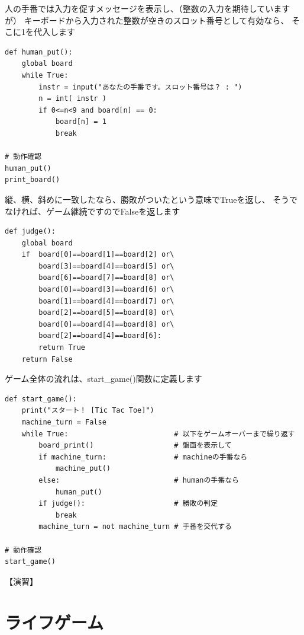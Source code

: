 \documentclass[uplatex,a4paper,11pt,oneside,openany]{jsbook}
\begin{document}
人の手番では入力を促すメッセージを表示し、（整数の入力を期待していますが）
キーボードから入力された整数が空きのスロット番号として有効なら、
そこに1を代入します

\begin{lstlisting}[caption=human_put,label=tictactoe03]
def human_put():
    global board
    while True:
        instr = input("あなたの手番です。スロット番号は？ : ")
        n = int( instr )
        if 0<=n<9 and board[n] == 0:
            board[n] = 1
            break

# 動作確認
human_put()
print_board()
\end{lstlisting}%

縦、横、斜めに一致したなら、勝敗がついたという意味でTrueを返し、
そうでなければ、ゲーム継続ですのでFalseを返します

\begin{lstlisting}[caption=judge,label=tictactoe04]
def judge():
    global board
    if  board[0]==board[1]==board[2] or\
        board[3]==board[4]==board[5] or\
        board[6]==board[7]==board[8] or\
        board[0]==board[3]==board[6] or\
        board[1]==board[4]==board[7] or\
        board[2]==board[5]==board[8] or\
        board[0]==board[4]==board[8] or\
        board[2]==board[4]==board[6]:
        return True
    return False
\end{lstlisting}%

ゲーム全体の流れは、start\_game()関数に定義します

\begin{lstlisting}[caption=game,label=tictactoe05]
def start_game():
    print("スタート！ [Tic Tac Toe]")
    machine_turn = False
    while True:                         # 以下をゲームオーバーまで繰り返す
        board_print()                   # 盤面を表示して
        if machine_turn:                # machineの手番なら
            machine_put()
        else:                           # humanの手番なら
            human_put()
        if judge():                     # 勝敗の判定
            break
        machine_turn = not machine_turn # 手番を交代する

# 動作確認
start_game()
\end{lstlisting}%



【演習】

\section{ライフゲーム}
\end{document}
